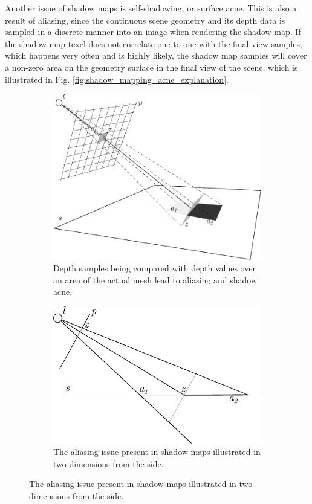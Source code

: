 Another issue of shadow maps is self-shadowing, or surface acne. This is also a result of aliasing, since the continuous scene geometry and its depth data is sampled in a discrete manner into an image when rendering the shadow map. If the shadow map texel does not correlate one-to-one with the final view samples, which happens very often and is highly likely, the shadow map samples will cover a non-zero area on the geometry surface in the final view of the scene, which is illustrated in Fig. \ref{fig:shadow_mapping_acne_explanation}.
\begin{figure}[hp]
	\centering
	\begin{subfigure}{0.7\textwidth}
        \includegraphics[width=\textwidth]{./graf/shadow_mapping_acne.pdf}
        \caption{Depth samples being compared with depth values over an area of the actual mesh lead to aliasing and shadow acne.}
        \label{fig:shadow_mapping_acne_explanation_3d}
    \end{subfigure}
	\begin{subfigure}{0.7\textwidth}
        \includegraphics[width=\textwidth]{./graf/shadow_mapping_acne_side.pdf}
        \caption{The aliasing issue present in shadow maps illustrated in two dimensions from the side.}
        \label{fig:shadow_mapping_acne_explanation_side}
    \end{subfigure}


\end{figure}
